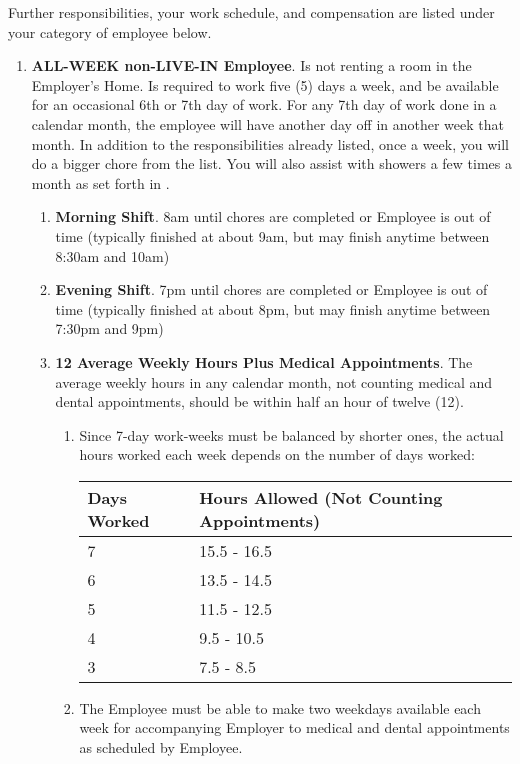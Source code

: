 \documentclass[]{article}
\newcommand{\sw}{.15\textwidth}
\newcommand{\allweek}{ALL-WEEK non-LIVE-IN Employee}
\begin{document}
Further responsibilities, your work schedule, and compensation are listed under your category of employee below.
\begin{enumerate}
	\item \textbf{\allweek{}}. \label{allweek}
		Is not renting a room in the Employer's Home. Is required to work five (5) days a week, and be available for an occasional 6th or 7th day of work. For any 7th day of work done in a calendar month, the employee will have another day off in another week that month. In addition to the responsibilities already listed, once a week, you will do a bigger chore from the \bigchores{} list. You will also assist with showers a few times a month as set forth in \shower{}. 
		\begin{enumerate}
			\item \textbf{Morning Shift}. 8am until chores are completed or Employee is out of time (typically finished at about 9am, but may finish anytime between 8:30am and 10am)
			\item \textbf{Evening Shift}. 7pm until chores are completed or Employee is out of time (typically finished at about 8pm, but may finish anytime between 7:30pm and 9pm)
			\item \textbf{12 Average Weekly Hours Plus Medical Appointments}. The average weekly hours in any calendar month, not counting medical and dental appointments, should be within half an hour of twelve (12). 
				\begin{enumerate}
					\item Since 7-day work-weeks must be balanced by shorter ones, the actual hours worked each week depends on the number of days worked:\\
						\noindent\begin{tabular}{|p{\sw}|p{\sw}|}
							\hline
							\rowcolor{medgray}
							Days Worked & Hours Allowed (Not Counting Appointments) \\ \hline
							7 & 15.5 - 16.5 \\ \hline
							6 & 13.5 - 14.5 \\ \hline
							5 & 11.5 - 12.5 \\ \hline
							4 & 9.5 - 10.5 \\ \hline
							3 & 7.5 - 8.5 \\
							\hline
						\end{tabular}
					\item The Employee must be able to make two weekdays available each week for accompanying Employer to medical and dental appointments as scheduled by Employee.

\end{enumerate}
\end{enumerate}
\end{enumerate}
\end{document}
